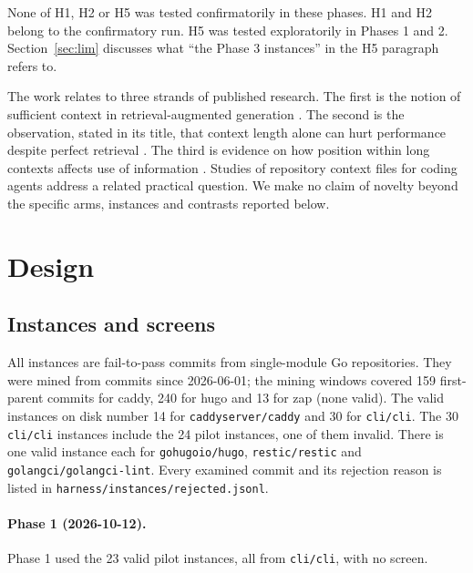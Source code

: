 None of H1, H2 or H5 was tested confirmatorily in these phases. H1 and H2 belong to the confirmatory run. H5 was tested exploratorily in Phases 1 and 2. Section~\ref{sec:lim} discusses what ``the Phase 3 instances'' in the H5 paragraph refers to.

The work relates to three strands of published research. The first is the notion of sufficient context in retrieval-augmented generation \cite{joren2025}. The second is the observation, stated in its title, that context length alone can hurt performance despite perfect retrieval \cite{du2025}. The third is evidence on how position within long contexts affects use of information \cite{liu2024}. Studies of repository context files for coding agents \cite{gloaguen2026} address a related practical question. We make no claim of novelty beyond the specific arms, instances and contrasts reported below.

\section{Design}

\subsection{Instances and screens}

All instances are fail-to-pass commits from single-module Go repositories. They were mined from commits since 2026-06-01; the mining windows covered 159 first-parent commits for caddy, 240 for hugo and 13 for zap (none valid). The valid instances on disk number 14 for \texttt{caddyserver/caddy} and 30 for \texttt{cli/cli}. The 30 \texttt{cli/cli} instances include the 24 pilot instances, one of them invalid. There is one valid instance each for \texttt{gohugoio/hugo}, \texttt{restic/restic} and \texttt{golangci/golangci-lint}. Every examined commit and its rejection reason is listed in \texttt{harness/instances/rejected.jsonl}.

\paragraph{Phase 1 (2026-10-12).} Phase 1 used the 23 valid pilot instances, all from \texttt{cli/cli}, with no screen.

